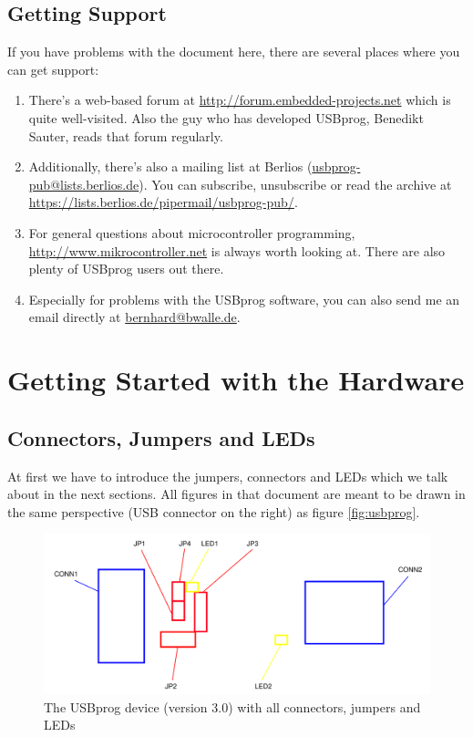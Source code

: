 \documentclass[bibtotoc,UKenglish,halfparskip,oneside,DIV12]{scrreprt}
\begin{document}
\section{Getting Support}
\label{sec:support}

If you have problems with the document here, there are several places where you can get support:

\begin{enumerate}
  \item There's a web-based forum at \url{http://forum.embedded-projects.net} which is quite
    well-visited. Also the guy who has developed USBprog, Benedikt Sauter, reads that forum
    regularly.

  \item Additionally, there's also a mailing list at Berlios (\url{usbprog-pub@lists.berlios.de}).
    You can subscribe, unsubscribe or read the archive at
    \url{https://lists.berlios.de/pipermail/usbprog-pub/}.

  \item For general questions about microcontroller programming,
    \url{http://www.mikrocontroller.net} is always worth looking at. There are also plenty of
    USBprog users out there.

  \item Especially for problems with the USBprog software, you can also send me an email
    directly at \url{bernhard@bwalle.de}.
\end{enumerate}



\chapter{Getting Started with the Hardware}

\section{Connectors, Jumpers and LEDs}

At first we have to introduce the jumpers, connectors and LEDs which we talk about in the next
sections. All figures in that document are meant to be drawn in the same perspective (USB connector
on the right) as figure \vref{fig:usbprog}.

\begin{figure}[ht]
  \centering
  \includegraphics{images/usbprog_components}
  \caption{The USBprog device (version 3.0) with all connectors, jumpers and LEDs}
  \label{fig:usbprog}
\end{figure}
\end{document}
